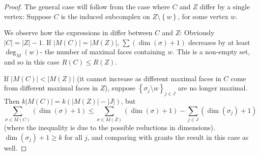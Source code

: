 \documentclass{article}
\newcommand{\prs}[1]{\left( #1 \right)}
\newcommand{\crb}[1]{\left\{ #1 \right\}}
\theoremstyle{plain}
\theoremstyle{definition}
\theoremstyle{remark}
\newcommand{\di}{dimension}
\begin{document}
\begin{proof}
The general case will follow from the case where $C$ and $Z$ differ by a single vertex:
Suppose $C$ is the induced subcomplex on $Z\setminus\crb{w}$, for some vertex $w$.  

We observe how the expressions in  differ between $C$ and $Z$: Obviously $|C|=|Z|-1$.
If $|M(C)|=|M(Z)|$, $\sum(\dim(\sigma)+1)$ decreases by at least $\deg_M(w)$- the number of maximal faces containing $w$. This is a non-empty set, and so in this case $R(C)\le R(Z)$.

If $|M(C)|<|M(Z)|$ (it cannot increase as different maximal faces in $C$ come from different maximal faces in $Z$), suppose $\crb{\sigma_j\setminus w}_{j\in J}$ are no longer maximal.
Then $k|M(C)|=k\prs{|M(Z)|-|J|}$, but 
$$\sum_{\sigma\in M(C)}(\dim(\sigma)+1)\le \sum_{\sigma\in M(Z)}(\dim(\sigma)+1)-\sum_{j\in J} (\dim(\sigma_j)+1)$$
(where the inequality is due to the possible reductions in \di s).
$\dim(\sigma_j)+1\ge k$ for all $j$, and comparing with  grants the result in this case as well.
\end{proof}
\end{document}
